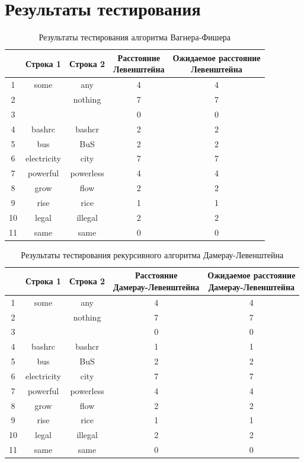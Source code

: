 \section{Результаты тестирования}

\begin{table}[H]
    \caption{Результаты тестирования алгоритма Вагнера-Фишера}
	\begin{tabular}{|c|c|c|c|c|}
 	\hline
    \No{} & Строка 1 & Строка 2 & \makecell{Расстояние\\Левенштейна} & \makecell{Ожидаемое расстояние\\Левенштейна} \\
 	\hline
 	1 & some & any & 4 & 4\\
 	\hline
 	2 & & nothing & 7 & 7\\
 	\hline
 	3 & & & 0 & 0\\
 	\hline
 	4 & bashrc & bashcr & 2 & 2\\
 	\hline
 	5 & bus & BuS & 2 & 2\\
 	\hline
 	6 & electricity & city & 7 & 7\\
 	\hline
 	7 & powerful & powerless & 4 & 4\\
 	\hline
 	8 & grow & flow & 2 & 2\\
 	\hline
 	9 & rise & rice & 1 & 1\\
 	\hline
    10 & legal & illegal & 2 & 2\\
 	\hline
    11 & same & same & 0 & 0\\
    \hline
	\end{tabular}
\end{table}

\begin{table}[H]
    \caption{Результаты тестирования рекурсивного алгоритма Дамерау-Левенштейна}
	\begin{tabular}{|c|c|c|c|c|}
 	\hline
    \No{} & Строка 1 & Строка 2 & \makecell{Расстояние\\Дамерау-Левенштейна} & \makecell{Ожидаемое расстояние\\Дамерау-Левенштейна} \\
 	\hline
 	1 & some & any & 4 & 4\\
 	\hline
 	2 & & nothing & 7 & 7\\
 	\hline
 	3 & & & 0 & 0\\
 	\hline
 	4 & bashrc & bashcr & 1 & 1\\
 	\hline
 	5 & bus & BuS & 2 & 2\\
 	\hline
 	6 & electricity & city & 7 & 7\\
 	\hline
 	7 & powerful & powerless & 4 & 4\\
 	\hline
 	8 & grow & flow & 2 & 2\\
 	\hline
 	9 & rise & rice & 1 & 1\\
 	\hline
    10 & legal & illegal & 2 & 2\\
 	\hline
    11 & same & same & 0 & 0\\
    \hline
	\end{tabular}
\end{table}

